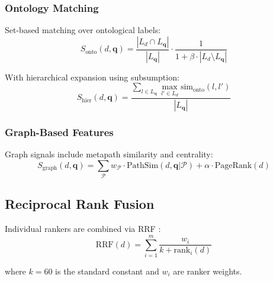 \documentclass{article}
\theoremstyle{definition}
\newcommand{\query}{\mathbf{q}}
\begin{document}
\subsubsection{Ontology Matching}

Set-based matching over ontological labels:
\begin{equation}
S_{\text{onto}}(d, \query) = \frac{|L_d \cap L_\query|}{|L_\query|} \cdot \frac{1}{1 + \beta \cdot |L_d \setminus L_\query|}
\end{equation}

With hierarchical expansion using subsumption:
\begin{equation}
S_{\text{hier}}(d, \query) = \frac{\sum_{l \in L_\query} \max_{l' \in L_d} \text{sim}_{\text{onto}}(l, l')}{|L_\query|}
\end{equation}

\subsubsection{Graph-Based Features}

Graph signals include metapath similarity and centrality:
\begin{equation}
S_{\text{graph}}(d, \query) = \sum_{\mathcal{P}} w_\mathcal{P} \cdot \text{PathSim}(d, \query | \mathcal{P}) + \alpha \cdot \text{PageRank}(d)
\end{equation}

\subsection{Reciprocal Rank Fusion}

Individual rankers are combined via RRF \citep{cormack2009reciprocal}:
\begin{equation}
\text{RRF}(d) = \sum_{i=1}^m \frac{w_i}{k + \text{rank}_i(d)}
\end{equation}

where $k=60$ is the standard constant and $w_i$ are ranker weights.
\end{document}
